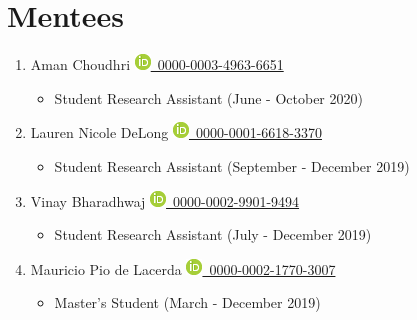 \documentclass[11pt,a4paper,sans]{moderncv} %
\begin{document}
    \section{Mentees}
    \begin{enumerate}
    \itemsep0.5em
        \item
            Aman Choudhri {\scriptsize     \href{https://orcid.org/0000-0003-4963-6651}{\includegraphics[scale=0.5]{img/ORCIDiD_icon16x16}\ 0000-0003-4963-6651}
}    \begin{itemize}
        \item
    {\scriptsize Student Research Assistant (June - October 2020)}
    \end{itemize}

        \item
            Lauren Nicole DeLong {\scriptsize     \href{https://orcid.org/0000-0001-6618-3370}{\includegraphics[scale=0.5]{img/ORCIDiD_icon16x16}\ 0000-0001-6618-3370}
}    \begin{itemize}
        \item
    {\scriptsize Student Research Assistant (September - December 2019)}
    \end{itemize}

        \item
            Vinay Bharadhwaj {\scriptsize     \href{https://orcid.org/0000-0002-9901-9494}{\includegraphics[scale=0.5]{img/ORCIDiD_icon16x16}\ 0000-0002-9901-9494}
}    \begin{itemize}
        \item
    {\scriptsize Student Research Assistant (July - December 2019)}
    \end{itemize}

        \item
            Mauricio Pio de Lacerda {\scriptsize     \href{https://orcid.org/0000-0002-1770-3007}{\includegraphics[scale=0.5]{img/ORCIDiD_icon16x16}\ 0000-0002-1770-3007}
}    \begin{itemize}
        \item
    {\scriptsize Master's Student (March - December 2019)}
    \end{itemize}


\end{enumerate}
\end{document}
